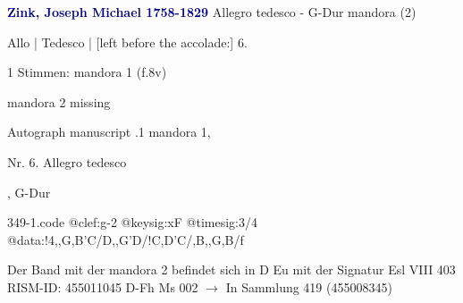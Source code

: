 \documentclass[twocolumn]{book}
\begin{document}
\newline \par \vspace{7pt} \textcolor{darkblue}{\textbf{Zink, Joseph Michael  1758-1829}}
\newline Allegro tedesco - G-Dur
\newline mandora (2)
\newline \begin{itshape}[f.8v, at left:] Allo | Tedesco | [left before the accolade:] 6.\end{itshape} 
\newline \textcolor{darkblue}{}  1 Stimmen: mandora 1  (f.8v)
\newline \begin{small} mandora 2 missing\end{small} 
\newline Autograph manuscript
.1  mandora 1, \begin{itshape}Nr. 6. Allegro tedesco\end{itshape}, G-Dur  
\begin{filecontents*}{349-1.code}
@clef:g-2
@keysig:xF
@timesig:3/4
@data:!4,,G,B'C/D,,G'D/!C,D'C/,B,,G,B/f
\end{filecontents*}
\newline
%
\newline Der Band mit der mandora 2 befindet sich in D Eu mit der Signatur Esl VIII 403
\newline RISM-ID: 455011045
\newline D-Fh  Ms 002
\newline $\rightarrow$ In Sammlung 419 (455008345)
      
\end{document}
